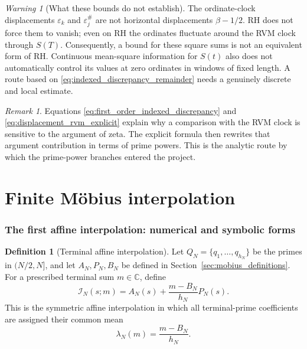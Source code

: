 \documentclass[11pt]{amsart}
\numberwithin{equation}{section}
\theoremstyle{plain}
\theoremstyle{definition}
\newtheorem{definition}[theorem]{Definition}
\theoremstyle{remark}
\newtheorem{remark}[theorem]{Remark}
\newtheorem{warning}[theorem]{Warning}
\newcommand{\1}{\mathbf{1}}
\begin{document}
\begin{warning}[What these bounds do not establish]
\label{warn:rvm_square_sum_not_RH}
The ordinate-clock displacements \(\varepsilon_k\) and
\(\varepsilon_j^{\#}\) are not horizontal displacements
\(\beta-1/2\).  RH does not force them to vanish; even on RH the ordinates
fluctuate around the RVM clock through \(S(T)\).  Consequently, a bound for
these square sums is not an equivalent form of RH.  Continuous mean-square
information for \(S(t)\) also does not automatically control its values at
zero ordinates in windows of fixed length.  A route based on
\eqref{eq:indexed_discrepancy_remainder} needs a genuinely discrete and
local estimate.
\end{warning}

\begin{remark}
\label{rem:rvm_origin_prime_formula}
Equations \eqref{eq:first_order_indexed_discrepancy} and
\eqref{eq:displacement_rvm_explicit} explain why a comparison with the RVM
clock is sensitive to the argument of zeta.  The explicit formula then
rewrites that argument contribution in terms of prime powers.  This is the
analytic route by which the prime-power branches entered the project.
\end{remark}

\part{Finite Möbius interpolation}


\section{The first affine interpolation: numerical and symbolic forms}
\label{sec:first_affine_interpolation}

\begin{definition}[Terminal affine interpolation]
\label{def:terminal_affine_interpolation}
Let \(Q_N=\{q_1,\ldots,q_{h_N}\}\) be the primes in \((N/2,N]\), and
let \(A_N,P_N,B_N\) be defined in Section~\ref{sec:mobius_definitions}.
For a prescribed terminal sum \(m\in\mathbb C\), define
\begin{equation}
\boxed{
\mathcal I_N(s;m)
=
A_N(s)+\frac{m-B_N}{h_N}P_N(s).
}
\label{eq:terminal_affine_interpolation}
\end{equation}
This is the symmetric affine interpolation in which all terminal-prime
coefficients are assigned their common mean
\begin{equation}
\lambda_N(m)=\frac{m-B_N}{h_N}.
\label{eq:terminal_mean_coefficient}
\end{equation}
\end{definition}
\end{document}
